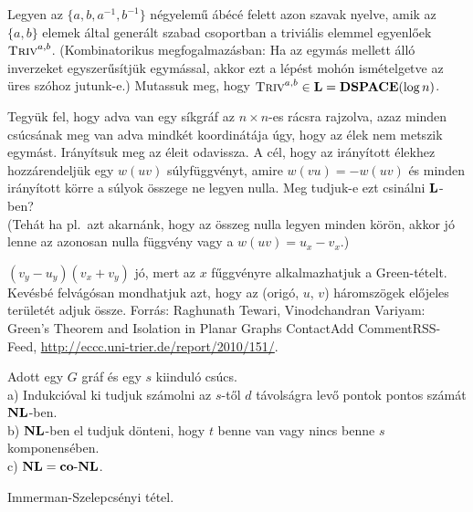 \begin{Exercise}[counter={sorszam}, difficulty=2]
	Legyen az $\{a,b,a^{-1},b^{-1}\}$ négyelem\H u ábécé felett azon szavak nyelve, amik az $\{a,b\}$ elemek által generált szabad csoportban a trivi\'alis elemmel egyenl\H oek $\mbox{\sc{Triv}}^{a,b}$.
	(Kombinatorikus megfogalmazásban: Ha az egymás mellett álló inverzeket egyszer\H usítjük egymással, akkor ezt a lépést mohón ismételgetve az üres szóhoz jutunk-e.)
	Mutassuk meg, hogy $\mbox{\sc{Triv}}^{a,b}\in \mbox{\ensuremath{\mathbf{L}}}=\mbox{\ensuremath{\mathbf{DSPACE}}}(\log n)$.
\end{Exercise}	

\begin{Exercise}[counter={sorszam}, difficulty=2]
	Tegy\"uk fel, hogy adva van egy s\'ikgr\'af az $n\times n$-es r\'acsra rajzolva, azaz minden cs\'ucs\'anak meg van adva mindk\'et koordin\'at\'aja \'ugy, hogy az \'elek nem metszik egym\'ast. Ir\'any\'itsuk meg az \'eleit odavissza. A c\'el, hogy az ir\'any\'itott \'elekhez hozz\'arendelj\"uk egy $w(uv)$ s\'ulyf\"uggv\'enyt, amire $w(vu)=-w(uv)$ \'es minden ir\'any\'itott k\"orre a s\'ulyok \"osszege ne legyen nulla. Meg tudjuk-e ezt csin\'alni $\mbox{\ensuremath{\mathbf{L}}}$-ben?\\
	(Teh\'at ha pl.\ azt akarn\'ank, hogy az \"osszeg nulla legyen minden k\"or\"on, akkor j\'o lenne az azonosan nulla f\"uggv\'eny vagy a $w(uv)=u_x-v_x$.)
\end{Exercise}	
\begin{Answer}
	$(v_y-u_y)(v_x+v_y)$ j\'o, mert az $x$ f\H uggv\'enyre alkalmazhatjuk a Green-t\'etelt.
	Kev\'esb\'e felv\'ag\'osan mondhatjuk azt, hogy az (orig\'o, $u$, $v$) h\'aromsz\"ogek el\H ojeles ter\"ulet\'et adjuk \"ossze.
	Forr\'as: Raghunath Tewari, Vinodchandran Variyam: Green's Theorem and Isolation in Planar Graphs
	ContactAdd CommentRSS-Feed,
	\url{  http://eccc.uni-trier.de/report/2010/151/}.
\end{Answer}




\begin{Exercise}[counter={sorszam}, difficulty=0]
	Adott egy $G$ gr\'af \'es egy $s$ kiindul\'o cs\'ucs.\\
	a) Indukci\'oval ki tudjuk sz\'amolni az $s$-t\H ol $d$ t\'avols\'agra lev\H o pontok pontos sz\'am\'at $\mbox{\ensuremath{\mathbf{NL}}}$-ben.\\
	b) $\mbox{\ensuremath{\mathbf{NL}}}$-ben el tudjuk d\"onteni, hogy $t$ benne van vagy nincs benne $s$ komponens\'eben.\\
	c) $\mbox{\ensuremath{\mathbf{NL}}}=\mbox{\ensuremath{\mathbf{co\text{-}NL}}}$.
\end{Exercise}	
\begin{Answer}
	Immerman-Szelepcsényi t\'etel.
\end{Answer} 

